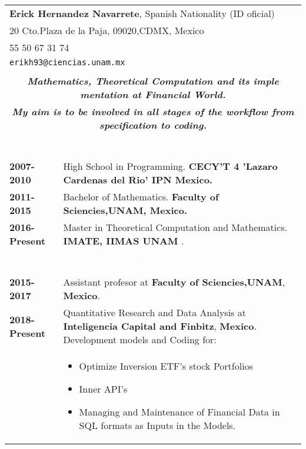 \documentclass[twoside,a4paper,openright,10pt]{report}
\begin{document}
\begin{table}[ht]
\centering
\begin{tabular}{p{40mm} p{140mm}}

\multicolumn{2}{l}{\textbf{Erick Hernandez Navarrete}, Spanish Nationality (ID oficial)}\\
\multicolumn{2}{l}{20 Cto.Plaza de la Paja, 09020,CDMX, Mexico}\\
\multicolumn{2}{l}{55 50 67 31 74}\\
\multicolumn{2}{l}{\texttt{erikh93@ciencias.unam.mx}}\\ \\
\multicolumn{2}{c}{\textbf{\textit{\large Mathematics, Theoretical Computation and its imple mentation at Financial World.}}}\\
\multicolumn{2}{c}{\textbf{\textit{\large My aim is to be involved in all stages of the workflow from specification to coding.}}}\\ \\

\multicolumn{2}{c}{\cellcolor{black} \textcolor{white}{Education}}\\ \\

 \textbf{2007-2010} & High School in Programming. 
\textbf{CECY'T 4 'Lazaro Cardenas del Rio' IPN Mexico.}\\
 \textbf{2011-2015} & Bachelor of Mathematics. \textbf{ Faculty of Sciencies,UNAM, Mexico.}\\
 \textbf{2016-Present}& Master in Theoretical Computation and Mathematics. 
 \textbf{ IMATE, IIMAS UNAM} .\\
\\

\multicolumn{2}{c}{\cellcolor{black} \textcolor{white}{Work Experience}}\\ \\

\textbf{2015-2017} & Assistant profesor at \textbf{Faculty of Sciencies,UNAM}, \textbf{Mexico}.\\

\textbf{2018-Present} & Quantitative Research and Data Analysis at  \textbf{Inteligencia Capital and Finbitz}, \textbf{Mexico}. Development models and Coding for:\\
& \vspace{-2mm} \begin{itemize}[noitemsep,nolistsep]
\item  Optimize Inversion ETF's stock Portfolios
\item Inner API's
\item Managing and Maintenance of Financial Data in SQL formats as Inputs in the Models.
\vspace{-4mm}
\end{itemize}\\


\end{tabular}
\end{table}
\end{document}
